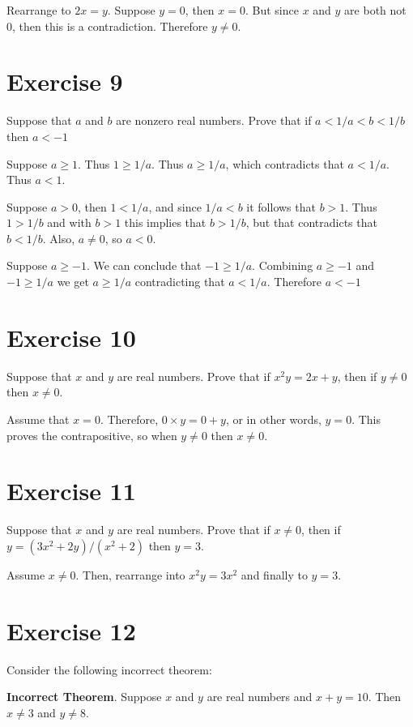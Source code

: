 \documentclass[11pt]{article}
\begin{document}
Rearrange to $2x = y$. Suppose $y = 0$, then $x = 0$. But since $x$ and $y$ 
are both not 0, then this is a contradiction. Therefore $y \neq 0$.

\section*{Exercise 9}

Suppose that $a$ and $b$ are nonzero real numbers. Prove that if 
$a < 1/a < b < 1/b$ then $a < -1$

Suppose $a \geq 1$. Thus $1 \geq 1/a$. Thus $a \geq 1/a$, which contradicts that 
$a < 1/a$. Thus $a < 1$. 

Suppose $a > 0$, then $1 < 1/a$, and since $1/a < b$ it follows that $b > 1$.
Thus $1 > 1/b$ and with $b > 1$ this implies that $b > 1/b$, but that 
contradicts that $b < 1/b$. Also, $a \neq 0$, so $a < 0$.

Suppose $a \geq -1$. We can conclude that $-1 \geq 1/a$. Combining $a \geq -1$ 
and $-1 \geq 1/a$ we get $a \geq 1/a$ contradicting that $a < 1/a$. Therefore 
$a < -1$

\section*{Exercise 10}

Suppose that $x$ and $y$ are real numbers. Prove that if $x^2 y = 2x + y$,
then if $y \neq 0$ then $x \neq 0$.

Assume that $x = 0$. Therefore, $0 \times y = 0 + y$, or in other words, 
$y = 0$. This proves the contrapositive, so when $y \neq 0$ then $x \neq 0$.


\section*{Exercise 11}

Suppose that $x$ and $y$ are real numbers. Prove that if $x \neq 0$, then 
if $y = (3x^2 + 2y)/(x^2 + 2)$ then $y = 3$.

Assume $x \neq 0$. Then, rearrange into $x^2 y = 3x^2$ and finally to $y = 3$. 

\section*{Exercise 12}

Consider the following incorrect theorem:

\textbf{Incorrect Theorem}. Suppose $x$ and $y$ are real numbers and
$x + y = 10$. Then $x \neq 3$ and $y \neq 8$.
\end{document}
